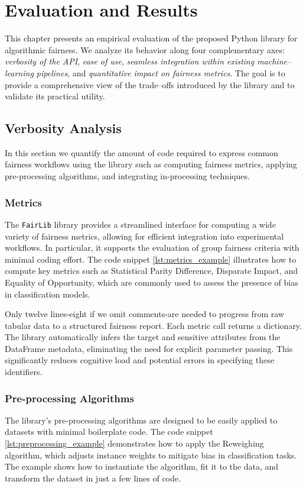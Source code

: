 \documentclass[12pt,a4paper,openright,twoside]{book}
\begin{document}
\chapter{Evaluation and Results}


This chapter presents an empirical evaluation of the proposed Python library for algorithmic fairness. We analyze its behavior along four complementary axes: \emph{verbosity of the API}, \emph{ease of use}, \emph{seamless integration within existing machine--learning pipelines}, and \emph{quantitative impact on fairness metrics}. The goal is to provide a comprehensive view of the trade--offs introduced by the library and to validate its practical utility.


\section{Verbosity Analysis}
In this section we quantify the amount of code required to express common fairness workflows using the library such as computing fairness metrics, applying pre-processing algorithms, and integrating in-processing techniques. 


\subsection{Metrics}
The \texttt{FairLib} library provides a streamlined interface for computing a wide variety of fairness metrics, allowing for efficient integration into experimental workflows. In particular, it supports the evaluation of group fairness criteria with minimal coding effort. The code snippet \ref{lst:metrics_example} illustrates how to compute key metrics such as Statistical Parity Difference, Disparate Impact, and Equality of Opportunity, which are commonly used to assess the presence of bias in classification models.



Only twelve lines-eight if we omit comments-are needed to progress from raw tabular data to a structured fairness report. Each metric call returns a dictionary. The library automatically infers the target and sensitive attributes from the DataFrame metadata, eliminating the need for explicit parameter passing. This significantly reduces cognitive load and potential errors in specifying these identifiers.

\subsection{Pre-processing Algorithms}
The library's pre-processing algorithms are designed to be easily applied to datasets with minimal boilerplate code. The code snippet \ref{lst:preprocessing_example} demonstrates how to apply the Reweighing algorithm, which adjusts instance weights to mitigate bias in classification tasks. The example shows how to instantiate the algorithm, fit it to the data, and transform the dataset in just a few lines of code.
\end{document}
